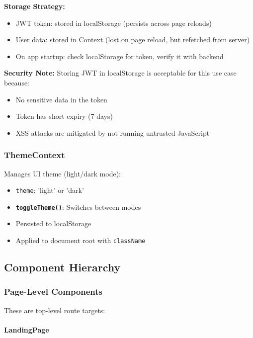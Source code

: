 \documentclass[12pt,a4paper,oneside]{article}
\newcommand{\funcname}[1]{\texttt{\textbf{#1}}}
\newcommand{\varname}[1]{\texttt{#1}}
\begin{document}
\textbf{Storage Strategy:}

\begin{itemize}
    \item JWT token: stored in localStorage (persists across page reloads)
    \item User data: stored in Context (lost on page reload, but refetched from server)
    \item On app startup: check localStorage for token, verify it with backend
\end{itemize}

\textbf{Security Note:} Storing JWT in localStorage is acceptable for this use case because:
\begin{itemize}
    \item No sensitive data in the token
    \item Token has short expiry (7 days)
    \item XSS attacks are mitigated by not running untrusted JavaScript
\end{itemize}

\subsubsection{ThemeContext}

Manages UI theme (light/dark mode):

\begin{itemize}
    \item \varname{theme}: 'light' or 'dark'
    \item \funcname{toggleTheme()}: Switches between modes
    \item Persisted to localStorage
    \item Applied to document root with \texttt{className}
\end{itemize}

\subsection{Component Hierarchy}

\subsubsection{Page-Level Components}

These are top-level route targets:

\paragraph{LandingPage}
\end{document}
